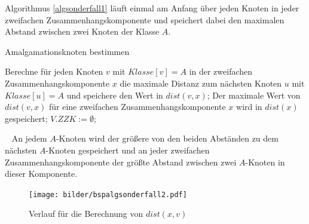 Algorithmus \ref{algsonderfall1} läuft einmal am Anfang über jeden Knoten in jeder zweifachen Zusammenhangskomponente und speichert dabei den maximalen Abstand zwischen zwei Knoten der Klasse $A$.\\
\vspace{-3mm}
\begin{algorithm}
\caption{Amalgamationsknoten bestimmen}
\begin{algorithmic}[1]
\vspace{2mm}
\STATE Berechne für jeden Knoten $v$ mit $Klasse[v]=A$ in der zweifachen Zusammenhangskomponente $x$ die maximale Distanz zum nächsten Knoten $u$ mit $Klasse[u]=A$ und speichere den Wert in $dist(v,x)$;
\STATE Der maximale Wert von $dist(v,x)$ für eine zweifachen Zusammenhangskomponente $x$ wird in $dist(x)$ gespeichert;
\STATE $V.ZZK:= \emptyset$;
\ENDFOR
\end{algorithmic}
\label{algsonderfall1}
\end{algorithm}
\vspace{-4mm}
~\linebreak
An jedem $A$-Knoten wird der größere von den beiden Abständen zu dem nächsten $A$-Knoten gespeichert und an jeder zweifachen Zusammenhangskomponente der größte Abstand zwischen zwei $A$-Knoten in dieser Komponente.\\
\vspace{-2mm}
\begin{figure}[h!]
\centering
\texttt{[image: bilder/bspalgsonderfall2.pdf]}
\caption{Verlauf für die Berechnung von $dist(x,v)$}
\label{bild:distberechnung}
\end{figure}
\vspace{-2mm}
